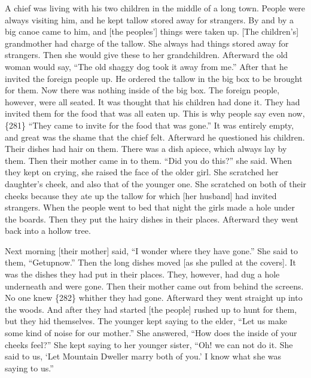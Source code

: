 A chief was living with his two children in the middle of a long town.
People were always visiting him, and he kept tallow stored away for strangers.
By and by a big canoe came to him, and [the peoples’] things were taken up.
{}[The children’s] grandmother had charge of the tallow.
She always had things stored away for strangers.
Then she would give these to her grandchildren.
Afterward the old woman would say,
“The old shaggy dog took it away from me.”
After that he invited the foreign people up.
He ordered the tallow in the big box to be brought for them.
Now there was nothing inside of the big box.
The foreign people, however, were all seated.
It was thought that his children had done it.
They had invited them for the food that was all eaten up.
This is why people say even now,
\{281\} “They came to invite for the food that was gone.”
It was entirely empty, and great was the shame that the chief felt.
Afterward he questioned his children.
Their dishes had hair on them.
There was a dish apiece, which always lay by them.
Then their mother came in to them.
“Did you do this?”
she said.
When they kept on crying, she raised the face of the older girl.
She scratched her daughter’s cheek, and also that of the younger one.
She scratched on both of their cheeks because they ate up the tallow for which [her husband] had invited strangers.
When the people went to bed that night the girls made a hole under the boards.
Then they put the hairy dishes in their places.
Afterward they went back into a hollow tree.

Next morning [their mother] said,
“I wonder where they have gone.”
She said to them,
“Getupnow.”
Then the long dishes moved [as she pulled at the covers].
It was the dishes they had put in their places.
They, however, had dug a hole underneath and were gone.
Then their mother came out from behind the screens.
No one knew \{282\} whither they had gone.
Afterward they went straight up into the woods.
And after they had started [the people] rushed up to hunt for them, but they hid themselves.
The younger kept saying to the elder,
“Let us make some kind of noise for our mother.”
She answered,
“How does the inside of your cheeks feel?”
She kept saying to her younger sister,
“Oh! we can not do it.
She said to us,
‘Let Mountain Dweller marry both of you.’
I know what she was saying to us.”


